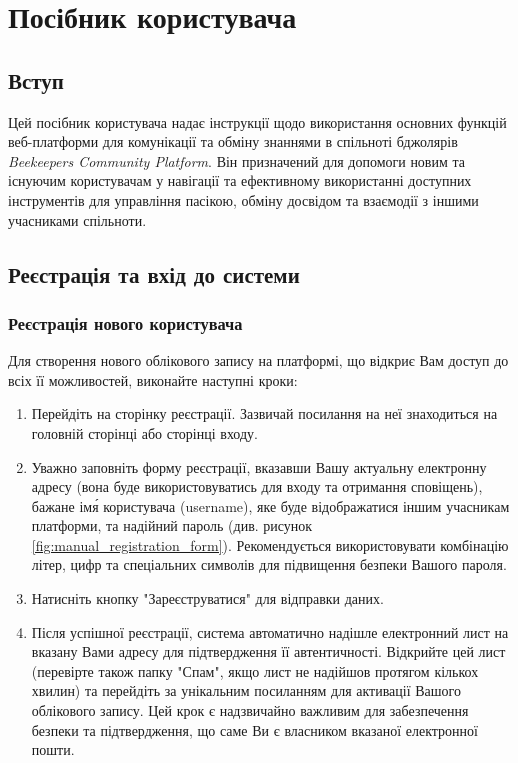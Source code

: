 \chapter{Посібник користувача}
\label{app:user_manual}

\section{Вступ}
\label{sec:manual_intro}
Цей посібник користувача надає інструкції щодо використання основних функцій веб-платформи для комунікації та обміну знаннями в спільноті бджолярів \textit{Beekeepers Community Platform}. Він призначений для допомоги новим та існуючим користувачам у навігації та ефективному використанні доступних інструментів для управління пасікою, обміну досвідом та взаємодії з іншими учасниками спільноти.

\section{Реєстрація та вхід до системи}
\label{sec:manual_auth}

\subsection{Реєстрація нового користувача}
\label{subsec:manual_registration}
Для створення нового облікового запису на платформі, що відкриє Вам доступ до всіх її можливостей, виконайте наступні кроки:
\begin{enumerate}
    \item Перейдіть на сторінку реєстрації. Зазвичай посилання на неї знаходиться на головній сторінці або сторінці входу.
    \item Уважно заповніть форму реєстрації, вказавши Вашу актуальну електронну адресу (вона буде використовуватись для входу та отримання сповіщень), бажане ім\'я користувача (username), яке буде відображатися іншим учасникам платформи, та надійний пароль (див. рисунок \ref{fig:manual_registration_form}). Рекомендується використовувати комбінацію літер, цифр та спеціальних символів для підвищення безпеки Вашого пароля.
    \item Натисніть кнопку "Зареєструватися" для відправки даних.
    \item Після успішної реєстрації, система автоматично надішле електронний лист на вказану Вами адресу для підтвердження її автентичності. Відкрийте цей лист (перевірте також папку "Спам", якщо лист не надійшов протягом кількох хвилин) та перейдіть за унікальним посиланням для активації Вашого облікового запису. Цей крок є надзвичайно важливим для забезпечення безпеки та підтвердження, що саме Ви є власником вказаної електронної пошти.
\end{enumerate}

